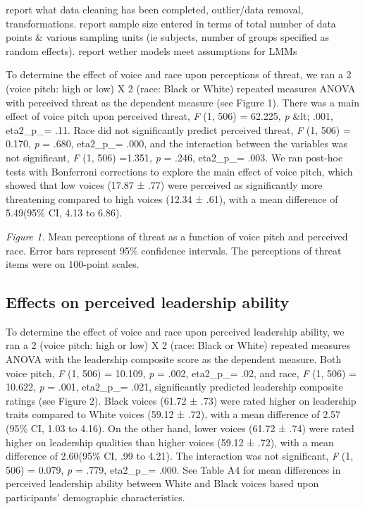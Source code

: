 \documentclass[
  english,
  man]{apa6}
\begin{document}
report what data cleaning has been completed, outlier/data removal, transformations. report sample size entered in terms of total number of data points \& various sampling units (ie subjects, number of groups specified as random effects). report wether models meet assumptions for LMMs

To determine the effect of voice and race upon perceptions of threat, we ran a 2 (voice pitch: high or low) X 2 (race: Black or White) repeated measures ANOVA with perceived threat as the dependent measure (see Figure 1). There was a main effect of voice pitch upon perceived threat, \emph{F} (1, 506) = 62.225, \emph{p} \&lt; .001, eta2\_p\_= .11. Race did not significantly predict perceived threat, \emph{F} (1, 506) = 0.170, \emph{p} = .680, eta2\_p\_= .000, and the interaction between the variables was not significant, \emph{F} (1, 506) =1.351, \emph{p} = .246, eta2\_p\_= .003. We ran post-hoc tests with Bonferroni corrections to explore the main effect of voice pitch, which showed that low voices (17.87 ± .77) were perceived as significantly more threatening compared to high voices (12.34 ± .61), with a mean difference of 5.49(95\% CI, 4.13 to 6.86).

\emph{Figure 1.} Mean perceptions of threat as a function of voice pitch and perceived race. Error bars represent 95\% confidence intervals. The perceptions of threat items were on 100-point scales.

\hypertarget{effects-on-perceived-leadership-ability}{%
\subsection{Effects on perceived leadership ability}\label{effects-on-perceived-leadership-ability}}

To determine the effect of voice and race upon perceived leadership ability, we ran a 2 (voice pitch: high or low) X 2 (race: Black or White) repeated measures ANOVA with the leadership composite score as the dependent measure. Both voice pitch, \emph{F} (1, 506) = 10.109, \emph{p} = .002, eta2\_p\_= .02, and race, \emph{F} (1, 506) = 10.622, \emph{p} = .001, eta2\_p\_= .021, significantly predicted leadership composite ratings (see Figure 2). Black voices (61.72 ± .73) were rated higher on leadership traits compared to White voices (59.12 ± .72), with a mean difference of 2.57 (95\% CI, 1.03 to 4.16). On the other hand, lower voices (61.72 ± .74) were rated higher on leadership qualities than higher voices (59.12 ± .72), with a mean difference of 2.60(95\% CI, .99 to 4.21). The interaction was not significant, \emph{F} (1, 506) = 0.079, \emph{p} = .779, eta2\_p\_= .000. See Table A4 for mean differences in perceived leadership ability between White and Black voices based upon participants' demographic characteristics.
\end{document}
